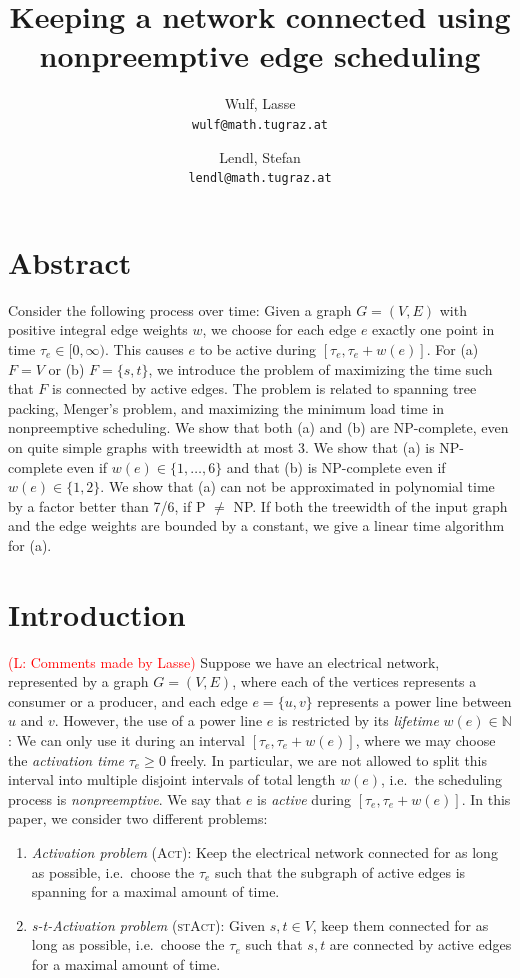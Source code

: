 \documentclass[10pt,a4paper]{article}
\author{
  Wulf, Lasse\\
  \texttt{wulf@math.tugraz.at}
  \and
  Lendl, Stefan\\
  \texttt{lendl@math.tugraz.at}
}
\title{Keeping a network connected using nonpreemptive edge scheduling}
\numberwithin{equation}{section}
\newcommand{\N}{\mathbb{N}}
\newcommand{\set}[1]{\{ #1 \}}
\newcommand{\fromto}[2]{\set{#1, \ldots, #2}}
\newcommand{\comment}[1]{\textcolor{red}{(L: #1)}}
\newcommand{\act}{\textsc{(Act)}}
\newcommand{\stact}{\textsc{(stAct)}}
\begin{document}
\maketitle 

\section{Abstract}
Consider the following process over time: Given a graph $G = (V,E)$ with positive integral edge weights $w$, we choose for each edge $e$ exactly one point in time $\tau_e \in [0, \infty)$. This causes $e$ to be active during $[\tau_e, \tau_e + w(e)]$. For (a) $F = V$ or (b) $F = \set{s,t}$, we introduce the problem of maximizing the time such that $F$ is connected by active edges. The problem is related to spanning tree packing, Menger's problem, and maximizing the minimum load time in nonpreemptive scheduling. We show that both (a) and (b) are NP-complete, even on quite simple graphs with treewidth at most 3. We show that (a) is NP-complete even if $w(e) \in \fromto{1}{6}$ and that (b) is NP-complete even if $w(e) \in \set{1,2}$. We show that (a) can not be approximated in polynomial time by a factor better than 7/6, if P $\neq$ NP. If both the treewidth of the input graph and the edge weights are bounded by a constant, we give a linear time algorithm for (a).
\section{Introduction}
\comment{Comments made by Lasse}
Suppose we have an electrical network, represented by a graph $G = (V,E)$, where each of the vertices represents a consumer or a producer, and each edge $e = \{u,v\}$ represents a power line between $u$ and $v$. However, the use of a power line $e$ is restricted by its \emph{lifetime} $w(e) \in \N$: We can only use it during an interval $[\tau_e, \tau_e + w(e)]$, where we may choose the \emph{activation time} $\tau_e \geq 0$ freely. In particular, we are not allowed to split this interval into multiple disjoint intervals of total length $w(e)$, i.e.\ the scheduling process is \emph{nonpreemptive}. We say that $e$ is \emph{active} during $[\tau_e, \tau_e + w(e)]$. In this paper, we consider two different problems:
\begin{enumerate}
\item \emph{Activation problem} \act: Keep the electrical network connected for as long as possible, i.e.\ choose the $\tau_e$ such that the subgraph of active edges is spanning for a maximal amount of time. 
\item \emph{s-t-Activation problem} \stact: Given $s, t \in V$, keep them connected for as long as possible, i.e.\ choose the $\tau_e$ such that $s, t$ are connected by active edges for a maximal amount of time.
\end{enumerate}
\end{document}
